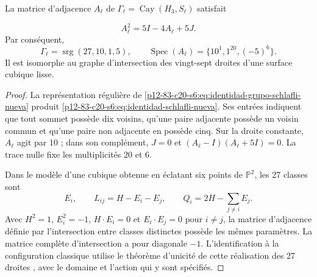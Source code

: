 \begin{theorem}
\label{p12-83-c20-s6:thm:grafo-27-rectas-nuevo}
La matrice d’adjacence \(A_\ell\) de
\(\Gamma_\ell=\operatorname{Cay}(H_3,S_\ell)\) satisfait

\begin{equation}
 A_\ell^2=5I-4A_\ell+5J.
 \label{p12-83-c20-s6:eq:identidad-schlafli-nueva}
\end{equation}
Par conséquent,
\[
 \Gamma_\ell=\operatorname{srg}(27,10,1,5),
 \qquad
 \operatorname{Spec}(A_\ell)=\{10^1,1^{20},(-5)^6\}.
\]
Il est isomorphe au graphe d'intersection des vingt-sept droites d'une surface cubique lisse.
\end{theorem}

\begin{proof}
La représentation régulière de
\cref{p12-83-c20-s6:eq:identidad-grupo-schlafli-nueva} produit
\cref{p12-83-c20-s6:eq:identidad-schlafli-nueva}. Ses entrées indiquent que tout sommet
possède dix voisins, qu’une paire adjacente possède un voisin commun et qu’une paire non
adjacente en possède cinq. Sur la droite constante, \(A_\ell\) agit par 10 ;
dans son complément, \(J=0\) et
\((A_\ell-I)(A_\ell+5I)=0\). La trace nulle fixe les multiplicités 20 et 6.


Dans le modèle d’une cubique obtenue en éclatant six points de
\(\mathbb P^2\), les 27 classes sont
\[
 E_i,\qquad L_{ij}=H-E_i-E_j,\qquad
 Q_i=2H-\sum_{j\ne i}E_j.
\]
Avec \(H^2=1\), \(E_i^2=-1\), \(H\cdot E_i=0\) et \(E_i\cdot E_j=0\) pour \(i\ne j\), la matrice d'adjacence définie par l'intersection entre classes distinctes possède les mêmes paramètres. La matrice complète d'intersection a pour diagonale \(-1\). L'identification à la configuration classique utilise le théorème d'unicité de cette réalisation des 27 droites \cite{Manivel2005}, avec le domaine et l'action qui y sont spécifiés.
\end{proof}

